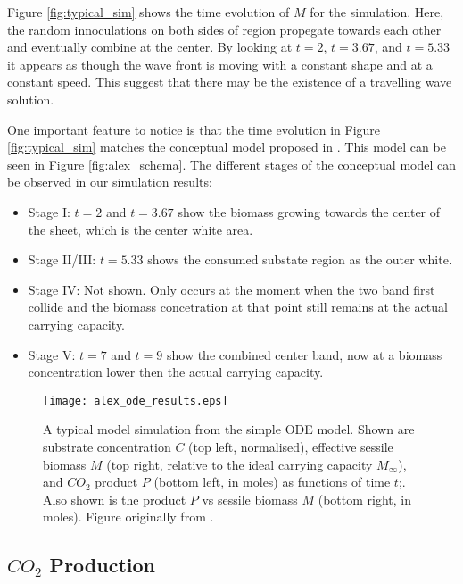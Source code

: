 Figure \ref{fig:typical_sim} shows the time evolution of $M$ for the simulation.
Here, the random innoculations on both sides of region propegate towards each other and eventually combine at the center.
By looking at $t=2$, $t=3.67$, and $t = 5.33$ it appears as though the wave front is moving with a constant shape and at a constant speed.
This suggest that there may be the existence of a travelling wave solution.

One important feature to notice is that the time evolution in Figure \ref{fig:typical_sim} matches the conceptual model proposed in \cite{dumitrache2015mathematicalModeling}.
This model can be seen in Figure \ref{fig:alex_schema}.
The different stages of the conceptual model can be observed in our simulation results: 
\begin{itemize}
  \item Stage I: $t = 2$ and $t = 3.67$ show the biomass growing towards the center of the sheet, which is the center white area.
  \item Stage II/III: $t = 5.33$ shows the consumed substate region as the outer white.
  \item Stage IV: Not shown. Only occurs at the moment when the two band first collide and the biomass concetration at that point still remains at the actual carrying capacity.
  \item Stage V: $t = 7$ and $t = 9$ show the combined center band, now at a biomass concentration lower then the actual carrying capacity.
\end{itemize}

\begin{figure}[h!tb]
  \centering
  \texttt{[image: alex\_ode\_results.eps]}
  \caption{A typical model simulation from the simple ODE model.
    Shown are substrate concentration $C$ (top left, normalised), effective sessile biomass $M$ (top right, relative to the ideal carrying capacity $M_{\infty}$), and $CO_2$ product $P$ (bottom left, in moles) as functions of time $t$;.
    Also shown is the product $P$ vs sessile biomass $M$ (bottom right, in moles).
    Figure originally from \cite{dumitrache2015mathematicalModeling}.
  }
  \label{fig:alex_ode_results}
\end{figure}

\subsection{$CO_2$ Production}


